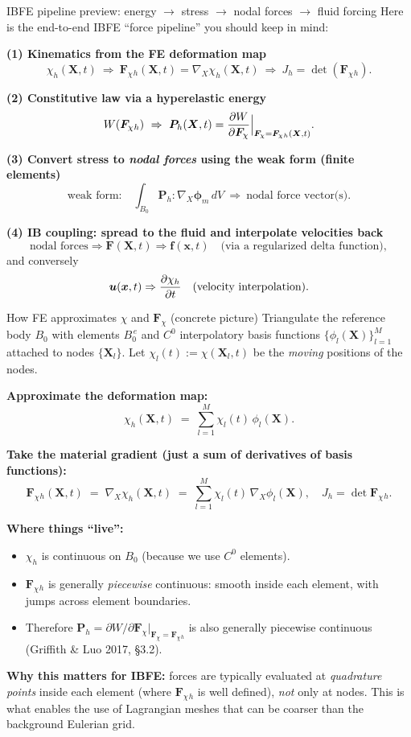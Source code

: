 \documentclass[aspectratio=169]{beamer}
\newcommand{\x}{\bm{x}}
\newcommand{\X}{\bm{X}}
\newcommand{\gradX}{\nabla_{\!X}}
\newcommand{\Fdef}{\bm{F}_{\chi}}  %
\newcommand{\Pten}{\bm{P}}         %
\newcommand{\fEuler}{\bm{f}}       %
\newcommand{\FLag}{\bm{F}}         %
\begin{document}
\begin{frame}{IBFE pipeline preview: energy \texorpdfstring{$\to$}{->} stress \texorpdfstring{$\to$}{->} nodal forces \texorpdfstring{$\to$}{->} fluid forcing}
\footnotesize
Here is the end-to-end IBFE ``force pipeline'' you should keep in mind:

\medskip
\textbf{(1) Kinematics from the FE deformation map}
\[
\chi_h(\X,t)\ \Rightarrow\ \Fdef{}_h(\X,t)=\gradX\chi_h(\X,t)\ \Rightarrow\ J_h=\det(\Fdef{}_h).
\]

\medskip
\textbf{(2) Constitutive law via a hyperelastic energy}
\[
W(\Fdef{}_h)\ \Rightarrow\ \Pten_h(\X,t)=\pdv{W}{\Fdef}\Big|_{\Fdef=\Fdef{}_h(\X,t)}.
\]

\medskip
\textbf{(3) Convert stress to \emph{nodal forces} using the weak form (finite elements)}
\[
\text{weak form:}\quad \int_{B_0} \Pten_h : \gradX \bm{\phi}_m\, dV
\ \Rightarrow\ \text{nodal force vector(s)}.
\]

\medskip
\textbf{(4) IB coupling: spread to the fluid and interpolate velocities back}
\[
\text{nodal forces} \Rightarrow \FLag(\X,t)\Rightarrow \fEuler(\x,t)
\quad\text{(via a regularized delta function)},
\]
and conversely
\[
\bm{u}(\x,t)\Rightarrow \pdv{\chi_h}{t}(\X,t)\quad\text{(velocity interpolation)}.
\]

\end{frame}



\begin{frame}{How FE approximates \(\chi\) and \(\Fdef\) (concrete picture)}
\footnotesize
Triangulate the reference body \(B_0\) with elements \(B_0^{\,e}\) and \(C^0\) interpolatory basis functions \(\{\phi_l(\X)\}_{l=1}^{M}\) attached to nodes \(\{\X_l\}\). Let \(\chi_l(t):=\chi(\X_l,t)\) be the \emph{moving} positions of the nodes.

\medskip
\textbf{Approximate the deformation map:}
\[
\chi_h(\X,t) \;=\; \sum_{l=1}^{M} \chi_l(t)\,\phi_l(\X).
\]

\medskip
\textbf{Take the material gradient (just a sum of derivatives of basis functions):}
\[
\Fdef{}_h(\X,t)
\;=\; \gradX \chi_h(\X,t)
\;=\; \sum_{l=1}^{M} \chi_l(t)\,\gradX \phi_l(\X),
\quad
J_h = \det \Fdef{}_h.
\]

\medskip
\textbf{Where things ``live'':}
\begin{itemize}
\item \(\chi_h\) is continuous on \(B_0\) (because we use \(C^0\) elements).
\item \(\Fdef{}_h\) is generally \emph{piecewise} continuous: smooth inside each element, with jumps across element boundaries.
\item Therefore \(\Pten_h = \partial W/\partial \Fdef\big|_{\Fdef = \Fdef{}_h}\) is also generally piecewise continuous (Griffith \& Luo 2017, \S3.2).
\end{itemize}

\medskip
\textbf{Why this matters for IBFE:} forces are typically evaluated at \emph{quadrature points} inside each element (where \(\Fdef{}_h\) is well defined), \emph{not} only at nodes. This is what enables the use of Lagrangian meshes that can be coarser than the background Eulerian grid.
\end{frame}
\end{document}
